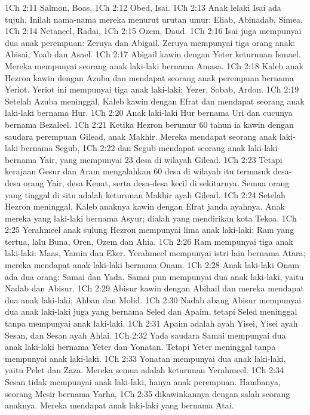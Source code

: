 1Ch 2:11  Salmon, Boas,
1Ch 2:12  Obed, Isai.
1Ch 2:13  Anak lelaki Isai ada tujuh. Inilah nama-nama mereka menurut urutan umur: Eliab, Abinadab, Simea,
1Ch 2:14  Netaneel, Radai,
1Ch 2:15  Ozem, Daud.
1Ch 2:16  Isai juga mempunyai dua anak perempuan: Zeruya dan Abigail. Zeruya mempunyai tiga orang anak: Abisai, Yoab dan Asael.
1Ch 2:17  Abigail kawin dengan Yeter keturunan Ismael. Mereka mempunyai seorang anak laki-laki bernama Amasa.
1Ch 2:18  Kaleb anak Hezron kawin dengan Azuba dan mendapat seorang anak perempuan bernama Yeriot. Yeriot ini mempunyai tiga anak laki-laki: Yezer, Sobab, Ardon.
1Ch 2:19  Setelah Azuba meninggal, Kaleb kawin dengan Efrat dan mendapat seorang anak laki-laki bernama Hur.
1Ch 2:20  Anak laki-laki Hur bernama Uri dan cucunya bernama Bezaleel.
1Ch 2:21  Ketika Hezron berumur 60 tahun ia kawin dengan saudara perempuan Gilead, anak Makhir. Mereka mendapat seorang anak laki-laki bernama Segub,
1Ch 2:22  dan Segub mendapat seorang anak laki-laki bernama Yair, yang mempunyai 23 desa di wilayah Gilead.
1Ch 2:23  Tetapi kerajaan Gesur dan Aram mengalahkan 60 desa di wilayah itu termasuk desa-desa orang Yair, desa Kenat, serta desa-desa kecil di sekitarnya. Semua orang yang tinggal di situ adalah keturunan Makhir ayah Gilead.
1Ch 2:24  Setelah Hezron meninggal, Kaleb anaknya kawin dengan Efrat janda ayahnya. Anak mereka yang laki-laki bernama Asyur; dialah yang mendirikan kota Tekoa.
1Ch 2:25  Yerahmeel anak sulung Hezron mempunyai lima anak laki-laki: Ram yang tertua, lalu Buna, Oren, Ozem dan Ahia.
1Ch 2:26  Ram mempunyai tiga anak laki-laki: Maas, Yamin dan Eker. Yerahmeel mempunyai istri lain bernama Atara; mereka mendapat anak laki-laki bernama Onam.
1Ch 2:28  Anak laki-laki Onam ada dua orang: Samai dan Yada. Samai pun mempunyai dua anak laki-laki, yaitu Nadab dan Abisur.
1Ch 2:29  Abisur kawin dengan Abihail dan mereka mendapat dua anak laki-laki; Ahban dan Molid.
1Ch 2:30  Nadab abang Abisur mempunyai dua anak laki-laki juga yang bernama Seled dan Apaim, tetapi Seled meninggal tanpa mempunyai anak laki-laki.
1Ch 2:31  Apaim adalah ayah Yisei, Yisei ayah Sesan, dan Sesan ayah Ahlai.
1Ch 2:32  Yada saudara Samai mempunyai dua anak laki-laki bernama Yeter dan Yonatan. Tetapi Yeter meninggal tanpa mempunyai anak laki-laki.
1Ch 2:33  Yonatan mempunyai dua anak laki-laki, yaitu Pelet dan Zaza. Mereka semua adalah keturunan Yerahmeel.
1Ch 2:34  Sesan tidak mempunyai anak laki-laki, hanya anak perempuan. Hambanya, seorang Mesir bernama Yarha,
1Ch 2:35  dikawinkannya dengan salah seorang anaknya. Mereka mendapat anak laki-laki yang bernama Atai.
